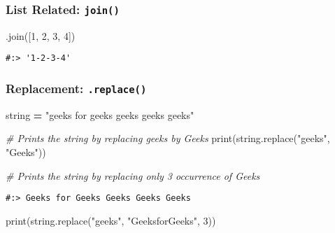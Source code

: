 \documentclass[
]{book}
\newenvironment{Shaded}{\begin{snugshade}}{\end{snugshade}}
\newcommand{\BuiltInTok}[1]{#1}
\newcommand{\CommentTok}[1]{\textcolor[rgb]{0.37,0.37,0.37}{\textit{#1}}}
\newcommand{\DecValTok}[1]{\textcolor[rgb]{0.06,0.06,0.06}{#1}}
\newcommand{\NormalTok}[1]{#1}
\newcommand{\OperatorTok}[1]{\textcolor[rgb]{0.43,0.43,0.43}{\textbf{#1}}}
\newcommand{\StringTok}[1]{\textcolor[rgb]{0.5,0.5,0.5}{#1}}
\begin{document}
\hypertarget{list-related-join}{%
\subsubsection{\texorpdfstring{List Related: \texttt{join()}}{List Related: join()}}\label{list-related-join}}

\begin{Shaded}
\begin{Highlighting}[]
\CommentTok{\textquotesingle{}{-}\textquotesingle{}}\NormalTok{.join([}\StringTok{\textquotesingle{}1\textquotesingle{}}\NormalTok{, }\StringTok{\textquotesingle{}2\textquotesingle{}}\NormalTok{, }\StringTok{\textquotesingle{}3\textquotesingle{}}\NormalTok{, }\StringTok{\textquotesingle{}4\textquotesingle{}}\NormalTok{])}
\end{Highlighting}
\end{Shaded}

\begin{verbatim}
#:> '1-2-3-4'
\end{verbatim}

\hypertarget{replacement-.replace}{%
\subsubsection{\texorpdfstring{Replacement: \texttt{.replace()}}{Replacement: .replace()}}\label{replacement-.replace}}

\begin{Shaded}
\begin{Highlighting}[]
\NormalTok{string }\OperatorTok{=} \StringTok{"geeks for geeks geeks geeks geeks"} 
   
\CommentTok{\# Prints the string by replacing geeks by Geeks  }
\BuiltInTok{print}\NormalTok{(string.replace(}\StringTok{"geeks"}\NormalTok{, }\StringTok{"Geeks"}\NormalTok{))  }
  
\CommentTok{\# Prints the string by replacing only 3 occurrence of Geeks   }
\end{Highlighting}
\end{Shaded}

\begin{verbatim}
#:> Geeks for Geeks Geeks Geeks Geeks
\end{verbatim}

\begin{Shaded}
\begin{Highlighting}[]
\BuiltInTok{print}\NormalTok{(string.replace(}\StringTok{"geeks"}\NormalTok{, }\StringTok{"GeeksforGeeks"}\NormalTok{, }\DecValTok{3}\NormalTok{)) }
\end{Highlighting}
\end{Shaded}
\end{document}

